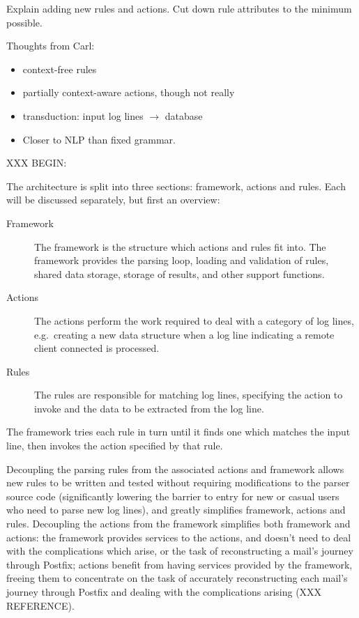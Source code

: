\documentclass[]{svmult}
\begin{document}
Explain adding new rules and actions.  Cut down rule attributes to the
minimum possible.

Thoughts from Carl: 

\begin{itemize}

    \item context-free rules

    \item partially context-aware actions, though not really

    \item transduction: input log lines $\rightarrow$ database

    \item Closer to NLP than fixed grammar.

\end{itemize}

XXX BEGIN\@:

The architecture is split into three sections: framework, actions and
rules.  Each will be discussed separately, but first an overview:

\begin{description}

    \item [Framework]  The framework is the structure which actions and
        rules fit into.  The framework provides the parsing loop, loading
        and validation of rules, shared data storage, storage of results,
        and other support functions.

    \item [Actions]  The actions perform the work required to deal with a
        category of log lines, e.g.\ creating a new data structure when a
        log line indicating a remote client connected is processed.

    \item [Rules]  The rules are responsible for matching log lines,
        specifying the action to invoke and the data to be extracted from
        the log line.

\end{description}

The framework tries each rule in turn until it finds one which matches the
input line, then invokes the action specified by that rule.

Decoupling the parsing rules from the associated actions and framework allows
new rules to be written and tested without requiring modifications to the
parser source code (significantly lowering the barrier to entry for new or
casual users who need to parse new log lines), and greatly simplifies
framework, actions and rules. Decoupling the actions from the
framework simplifies both framework and actions: the framework provides
services to the actions, and doesn't need to deal with the complications which
arise, or the task of reconstructing a mail's journey through Postfix; actions
benefit from having services provided by the framework, freeing them to
concentrate on the task of accurately reconstructing each mail's journey
through Postfix and dealing with the complications arising (XXX REFERENCE).
\end{document}
